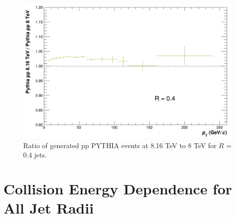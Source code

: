 \documentclass[ALICE]{ALICE_analysis_notes}
\newcommand{\pp}{pp\xspace}
\begin{document}
\begin{appendix}
\begin{figure}[h!]
    \centering
    \includegraphics[width=\textwidth]{figures/ScaleFactorPythia/PythiaRatio_R04.png}
    \caption{Ratio of generated \pp PYTHIA events at 8.16 TeV to 8 TeV for $R$ = 0.4 jets.}
    \label{fig:appPythiaScaleFactorR04}
\end{figure}


\section{Collision Energy Dependence for All Jet Radii}\label{sec:appendixCollEnergyDep}


\end{appendix}
\end{document}
